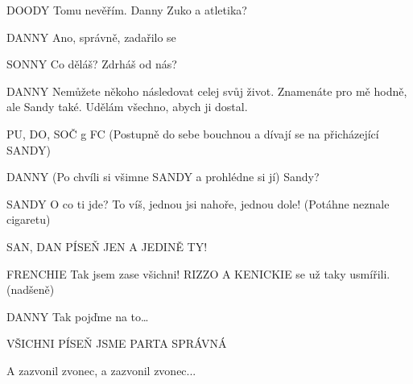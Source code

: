 DOODY        Tomu nevěřím. Danny Zuko a atletika?

DANNY        Ano, správně, zadařilo se

SONNY        Co děláš? Zdrháš od nás?

DANNY        Nemůžete někoho následovat celej svůj život. Znamenáte pro mě hodně, ale         Sandy také. Udělám všechno, abych ji dostal. 

PU, DO, SOČ g FC        (Postupně do sebe bouchnou a dívají se na přicházející SANDY) 

DANNY        (Po chvíli si všimne SANDY a prohlédne si jí) Sandy?

SANDY        O co ti jde?  To víš, jednou jsi nahoře, jednou dole! (Potáhne neznale         cigaretu)

SAN, DAN        PÍSEŇ JEN A JEDINĚ TY! 





FRENCHIE        Tak jsem zase všichni! RIZZO A KENICKIE se už taky usmířili. (nadšeně) 

DANNY        Tak pojďme na to…

VŠICHNI        PÍSEŇ JSME PARTA SPRÁVNÁ 

A zazvonil zvonec, a zazvonil zvonec...



\bye

